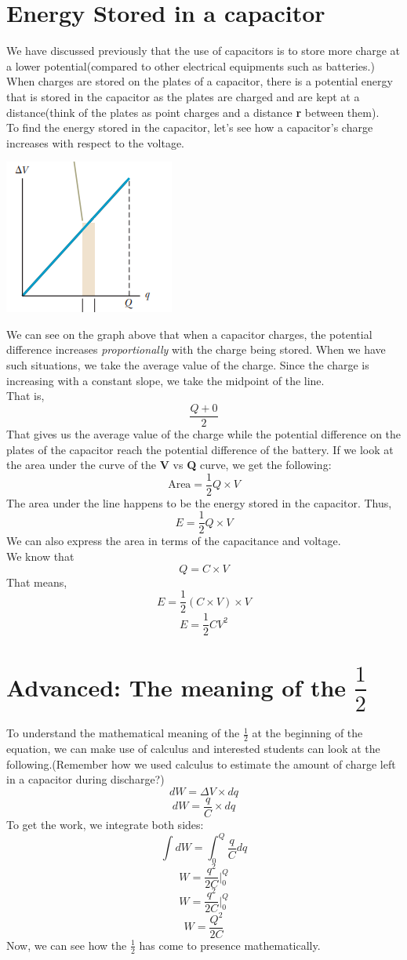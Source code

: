 \documentclass[9pt]{exam}
\begin{document}
	\section*{Energy Stored in a capacitor}
	We have discussed previously that the use of capacitors is to store more charge at a lower potential(compared to other electrical equipments such as batteries.) When charges are stored on the plates of a capacitor, there is a potential energy that is stored in the capacitor as the plates are charged and are kept at a distance(think of the plates as point charges and a distance \textbf{r} between them). \\
	To find the energy stored in the capacitor, let's see how a capacitor's charge increases with respect to the voltage. \begin{center}
		\includegraphics[scale=0.7]{v_q_curve.png}
	\end{center}
	We can see on the graph above that when a capacitor charges, the potential difference increases \textit{proportionally} with the charge being stored. When we have such situations, we take the average value of the charge. Since the charge is increasing with a constant slope, we take the midpoint of the line. \\
	That is,
	$$\frac{Q + 0}{2}$$
	That gives us the average value  of the charge while the potential difference on the plates of the capacitor reach the potential difference of the battery. If we look at the area under the curve of the \textbf{V} vs \textbf{Q} curve, we get the following:
	$$\text{Area}=\frac{1}{2}Q\times V$$
	The area under the line happens to be the energy stored in the capacitor. Thus,
	$$E = \frac{1}{2}Q\times V$$
	We can also express the area in terms of the capacitance and voltage.
	\\
	\newline
	We know that $$Q = C \times V$$
	That means,
	$$E = \frac{1}{2}(C\times V)\times V$$
	$$E = \frac{1}{2}CV^2$$
	
	\section*{Advanced: The meaning of the $\dfrac{1}{2}$}
	To understand the mathematical meaning of the $\frac{1}{2}$ at the beginning of the equation, we can make use of calculus and interested students can look at the following.(Remember how we used calculus to estimate the amount of charge left in a capacitor during discharge?)
	$$dW = \varDelta V\times dq$$
	$$dW = \frac{q}{C}\times dq$$
	To get the work, we integrate both sides:
	$$\int dW =\int_{0}^{Q}\frac{q}{C}dq$$
	$$ W =\frac{q^2}{2C}\Big|_0^Q $$
	$$ W =\frac{q^2}{2C}\Big|_0^Q $$
	$$ W =\frac{Q^2}{2C}$$
	Now, we can see how the $\frac{1}{2}$ has come to presence mathematically.
\end{document}
